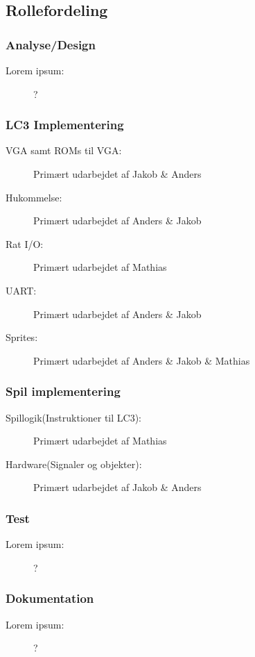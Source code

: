 \subsection*{Rollefordeling}
\subsubsection*{Analyse/Design}
\begin{description}
	\item[Lorem ipsum:] ?
\end{description}

\subsubsection*{LC3 Implementering}
\begin{description}
	\item[VGA samt ROMs til VGA:] Primært udarbejdet af Jakob \& Anders
	\item[Hukommelse:] Primært udarbejdet af Anders \& Jakob
	\item[Rat I/O:] Primært udarbejdet af Mathias
	\item[UART:] Primært udarbejdet af Anders \& Jakob
	\item[Sprites:] Primært udarbejdet af Anders \& Jakob \& Mathias
\end{description}

\subsubsection*{Spil implementering}
\begin{description}
	\item[Spillogik(Instruktioner til LC3):] Primært udarbejdet af Mathias
	\item[Hardware(Signaler og objekter):] Primært udarbejdet af Jakob \& Anders
\end{description}

\subsubsection*{Test}
\begin{description}
	\item[Lorem ipsum:] ?
\end{description}

\subsubsection*{Dokumentation}
\begin{description}
	\item[Lorem ipsum:] ?
\end{description}